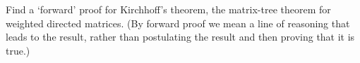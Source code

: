 
Find a `forward' proof for Kirchhoff's theorem, the matrix-tree theorem for weighted directed matrices. (By forward proof we mean a line of reasoning that leads to the result, rather than postulating the result and then proving that it is true.)
